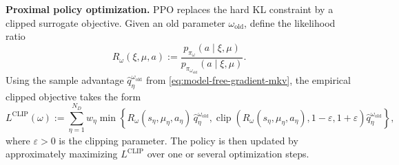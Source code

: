 \documentclass[a4paper, 10pt, english, reqno]{amsart}
\begin{document}
\smallskip

\noindent\textbf{Proximal policy optimization.}
PPO replaces the hard KL constraint by a clipped surrogate objective. Given an old parameter $\omega_{\mathrm{old}}$, define the likelihood ratio
\[
  R_\omega(\xi,\mu,a)
  :=
  \frac{p_{\pi_\omega}(a\mid \xi,\mu)}
       {p_{\pi_{\omega_{\mathrm{old}}}}(a\mid \xi,\mu)}.
\]
Using the sample advantage $\widehat q_\eta^{\omega_{\mathrm{old}}}$ from \eqref{eq:model-free-gradient-mkv}, the empirical clipped objective takes the form
\[
  L^{\mathrm{CLIP}}(\omega)
  :=
  \sum_{\eta=1}^{N_D}w_\eta
  \min\!\left\{
    R_\omega(s_\eta,\mu_\eta,a_\eta)\,\widehat q_\eta^{\omega_{\mathrm{old}}},
    \operatorname{clip}\!\left(R_\omega(s_\eta,\mu_\eta,a_\eta),1-\varepsilon,1+\varepsilon\right)\widehat q_\eta^{\omega_{\mathrm{old}}}
  \right\},
\]
where $\varepsilon>0$ is the clipping parameter. The policy is then updated by approximately maximizing $L^{\mathrm{CLIP}}$ over one or several optimization steps.
\end{document}
